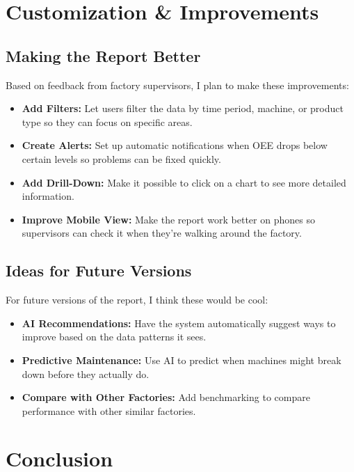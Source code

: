 \documentclass{article}
\begin{document}
\section{Customization \& Improvements}

\subsection{Making the Report Better}
Based on feedback from factory supervisors, I plan to make these improvements:

\begin{itemize}
    \item \textbf{Add Filters:} Let users filter the data by time period, machine, or product type so they can focus on specific areas.
    
    \item \textbf{Create Alerts:} Set up automatic notifications when OEE drops below certain levels so problems can be fixed quickly.
    
    \item \textbf{Add Drill-Down:} Make it possible to click on a chart to see more detailed information.
    
    \item \textbf{Improve Mobile View:} Make the report work better on phones so supervisors can check it when they're walking around the factory.
\end{itemize}

\subsection{Ideas for Future Versions}
For future versions of the report, I think these would be cool:

\begin{itemize}
    \item \textbf{AI Recommendations:} Have the system automatically suggest ways to improve based on the data patterns it sees.
    
    \item \textbf{Predictive Maintenance:} Use AI to predict when machines might break down before they actually do.
    
    \item \textbf{Compare with Other Factories:} Add benchmarking to compare performance with other similar factories.
\end{itemize}

\section{Conclusion}
\end{document}
